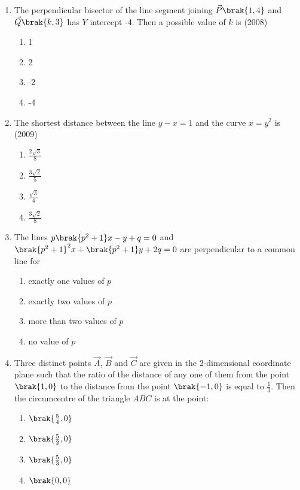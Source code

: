 \begin{enumerate}
\begin{multicols}{4}
\begin{enumerate}
\item -2
\end{enumerate}
\end{multicols}
%
\item The perpendicular bisector of the line segment joining $\vec{P}\brak{1,4}$ and $\vec{Q}\brak{k, 3}$ has $Y$ intercept -4. Then a possible value of $k$ is \hfill{(2008)}
\begin{multicols}{4}
\begin{enumerate}
\item 1
\item 2
\item -2
\item -4
\end{enumerate}
\end{multicols} 
%
\item The shortest distance between the line $y- x =1$ and the 
	curve $x=y^{2}$ is \hfill{(2009)}
\begin{multicols}{4}
\begin{enumerate}
\item $\frac{2\sqrt{3}}{8}$
\item $\frac{3\sqrt{2}}{5}$
\item $\frac{\sqrt{3}}{4}$
\item $\frac{3\sqrt{2}}{8}$
\end{enumerate}
\end{multicols}
%
\item The lines $p\brak{p^{2}+1}x-y+q=0$ and $\brak{p^{2}+1}^{2}x+\brak{p^{2}+1}y+ 2q=0$ are perpendicular to a common line for  \hfill {}
\begin{multicols}{2}
\begin{enumerate}
\item exactly one values of $p$
\item exactly two values of $p$ 
\item more than two values of $p$ 
\item no value of $p$ 
\end{enumerate}
\end{multicols}
%
\item Three distinct points $\vec{A}$, $\vec{B}$ and $\vec{C}$ are given in the 
2-dimensional coordinate plane such that the ratio of the 
distance of any one of them from the point $\brak{1, 0}$ to the distance from
the point $\brak{-1, 0}$ is equal to $\frac{1}{3}$. Then the circumcentre of the triangle $ABC$ is at the point: \hfill {}
\begin{multicols}{4}
\begin{enumerate}
\item $\brak{\frac{5}{4}, 0}$
\item $\brak{\frac{5}{2}, 0}$
\item $\brak{\frac{5}{3}, 0}$
\item $\brak{0, 0}$
\end{enumerate}
\end{multicols} 


\end{enumerate}
